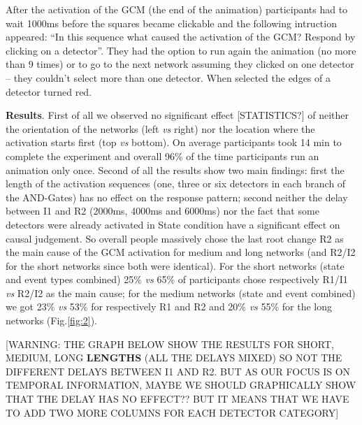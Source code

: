 \documentclass[10pt,letterpaper]{article}
\begin{document}
After the activation of the GCM (the end of the animation) participants had to wait 1000ms before the squares became clickable and the following intruction appeared: ``In this sequence what caused the activation of the GCM? Respond by clicking on a detector''. They had the option to run again the animation (no more than 9 times) or to go to the next network assuming they clicked on one detector -- they couldn't select more than one detector. When selected the edges of a detector turned red.

\textbf{Results}. First of all we observed no significant effect [STATISTICS?] of neither the orientation of the networks (left \textit{vs} right) nor the location where the activation starts first (top \textit{vs} bottom). On average participants took 14 min to complete the experiment and overall 96\% of the time participants run an animation only once. Second of all the results show two main findings: first the length of the activation sequences (one, three or six detectors in each branch of the AND-Gates) has no effect on the response pattern; second neither the delay between I1 and R2 (2000ms, 4000ms and 6000ms) nor the fact that some detectors were already activated in State condition have a significant effect on causal judgement. So overall people massively chose the last root change R2 as the main cause of the GCM activation for medium and long networks (and R2/I2 for the short networks since both were identical). For the short networks (state and event types combined) 25\% \textit{vs} 65\% of participants chose respectively R1/I1 \textit{vs} R2/I2 as the main cause; for the medium networks (state and event combined) we got 23\% \textit{vs} 53\% for respectively R1 and R2 and 20\% \textit{vs} 55\% for the long networks (Fig.\ref{fig:2}). 

[WARNING: THE GRAPH BELOW SHOW THE RESULTS FOR SHORT, MEDIUM, LONG \textbf{LENGTHS} (ALL THE DELAYS MIXED) SO NOT THE DIFFERENT DELAYS BETWEEN I1 AND R2. BUT AS OUR FOCUS IS ON TEMPORAL INFORMATION, MAYBE WE SHOULD GRAPHICALLY SHOW THAT THE DELAY HAS NO EFFECT?? BUT IT MEANS THAT WE HAVE TO ADD TWO MORE COLUMNS FOR EACH DETECTOR CATEGORY]
\end{document}
